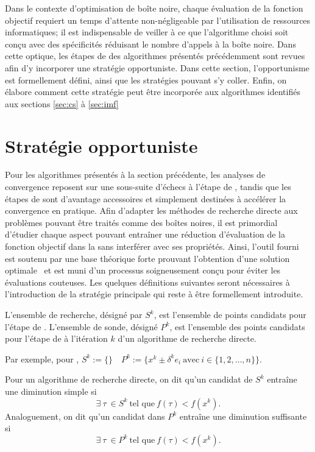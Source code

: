 \label{sec:Theme2}
Dans le contexte d'optimisation de boîte noire, chaque évaluation de la fonction objectif requiert un temps d'attente non-négligeable par l'utilisation de ressources informatiques; il est indispensable de veiller à ce que l'algorithme choisi soit conçu avec des spécificités réduisant le nombre d'appels à la boîte noire. Dans cette optique, les étapes de \POLL des algorithmes présentés précédemment sont revues afin d'y incorporer une stratégie opportuniste. Dans cette section, l'opportunisme est formellement défini, ainsi que les stratégies pouvant s'y coller. Enfin, on élabore comment cette stratégie peut être incorporée aux algorithmes identifiés aux sections \ref{sec:cs} à \ref{sec:imf}
\section{Stratégie opportuniste}\label{sec:opp}
Pour les algorithmes présentés à la section précédente, les analyses de convergence reposent sur une sous-suite d'échecs à l'étape de \POLL, tandis que les étapes de \SEARCH sont d'avantage accessoires et simplement destinées à accélérer la convergence en pratique. Afin d'adapter les méthodes de recherche directe aux problèmes pouvant être traités comme des boîtes noires, il est primordial d'étudier chaque aspect pouvant entraîner une réduction d'évaluation de la fonction objectif dans la \POLL sans interférer avec ses propriétés. Ainsi, l'outil fourni est soutenu par une base théorique forte prouvant l'obtention d'une solution optimale~\cite{Torc97a,CoPr01a,AuDe2006,Kelley2011,KoLeTo03a} et est muni d'un processus soigneusement conçu pour éviter les évaluations couteuses. Les quelques définitions suivantes seront nécessaires à l'introduction de la stratégie principale qui reste à être formellement introduite.
\theoremstyle{definition}
\begin{definition}\label{def:poll}
L'ensemble de recherche, désigné par $S^k$, est l'ensemble de points candidats pour l'étape de \SEARCH. L'ensemble de sonde, désigné $P^k$, est l'ensemble des points candidats pour l'étape de \POLL à l'itération $k$ d'un algorithme de recherche directe.
\end{definition} 
Par exemple, pour \CS, $S^k := \{\}$~~$P^k :=\{x^k \pm \delta^ke_i ~\text{avec}~ i \in \{1,2,\dots,n\}\}$. 
\begin{definition}\label{def:simpledecrease}
Pour un algorithme de recherche directe, on dit qu'un candidat de $S^k$ entraîne une diminution simple si 
\begin{equation}\label{eq:simpledecrease}
\exists~\tau~\in S^k~ \text{tel que}~ f(\tau) < f(x^k).
\end{equation}
Analoguement, on dit qu'un candidat dans $P^k$ entraîne une diminution suffisante si 
\begin{equation}\label{eq:sufficientdecrease}
\exists~\tau~\in P^k ~\text{tel que} ~ f(\tau) < f(x^k).
\end{equation}
\end{definition}
